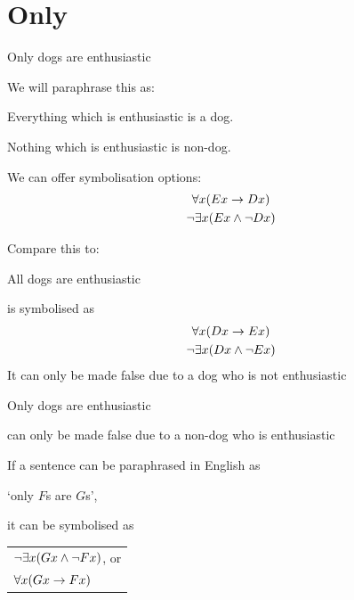 	
	
	
	
	
	\section{Only}\label{sec:SymboliseFOLOnly}

	
		\begin{samplesent}
		\item Only dogs are enthusiastic
	\end{samplesent}
	We will paraphrase this as:
	\begin{samplesent}
		\item Everything which is enthusiastic is a dog.
		\item Nothing which is enthusiastic is non-dog.
	\end{samplesent}
	
	We can offer symbolisation options:
	\begin{gather*}
		\forall x(Ex\rightarrow Dx)\\
		\neg\exists x(Ex\mathbin{\wedge} \neg Dx)
	\end{gather*}
	
Compare this to:
			\begin{samplesent}
		\item All dogs are enthusiastic
	\end{samplesent}
	is symbolised as 
		\begin{gather*}
		\forall x(Dx\rightarrow Ex)\\
		\neg\exists x(Dx\mathbin{\wedge} \neg Ex)
	\end{gather*}
	It can only be made false due to a dog who is not enthusiastic
	\begin{samplesent}
		\item Only dogs are enthusiastic
	\end{samplesent}
		can only be made false due to a non-dog who is enthusiastic
		
	\begin{highlighted}
		If a sentence can be paraphrased in English as \begin{center}
			`only $F$s are $G$s',
		\end{center} it can be symbolised as \begin{center}
			\begin{tabular}{l}$\neg\exists x (\mathord{G}x \mathbin{\wedge} \neg\mathord{F}x)$, or \\$\forall x (\mathord{G}x \rightarrow \mathord{F}x)$
			\end{tabular}
		\end{center}
	\end{highlighted}
	
